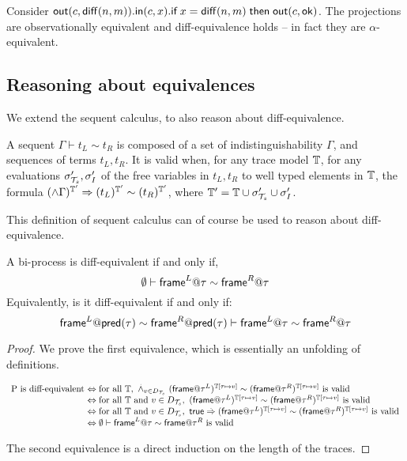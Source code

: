 \begin{example} \label{ex:problem}
  Consider $\mathsf{out}(c,\mathsf{diff}(n,m)).
  \mathsf{in}(c,x).
  \textsf{if}\; x=\mathsf{diff}(n,m) \;\textsf{then}\; \mathsf{out}(c,\mathsf{ok})$.
  The projections are observationally equivalent and diff-equivalence
  holds -- in fact they are $\alpha$-equivalent.
\end{example}


\subsection{Reasoning about equivalences}

We extend the sequent calculus, to also reason about diff-equivalence.

\begin{definition}
  A sequent $\Gamma \vdash t_L \sim t_R $ is composed of a set of indistinguishability $\Gamma$, and sequences of terms $t_L,t_R$.
  It is valid when, for any trace model $\mathbb{T}$, for any evaluations $\sigma_{\mathcal{T}_s}',\sigma_I'$ of the free variables in $t_L,t_R$ to well typed elements in $\mathbb{T}$, the formula $ (\wedge \Gamma)^{\mathbb{T}'} \Rightarrow (t_L)^{\mathbb{T}'} \sim  (t_R)^{\mathbb{T}'}$, where $\mathbb{T}'=\mathbb{T} \cup \sigma_{\mathcal{T}_s}'\cup \sigma_I'$.
\end{definition}

This definition of sequent calculus can of course be used to reason about diff-equivalence.
\begin{lemma}
  A bi-process is diff-equivalent if and only if,
  \[ \emptyset \vdash  \textsf{frame}^L@\tau \sim \textsf{frame}^R@\tau\]
  Equivalently, is it diff-equivalent if and only if:
  \[\textsf{frame}^L@\textsf{pred}(\tau) \sim \textsf{frame}^R@\textsf{pred}(\tau) \vdash \textsf{frame}^L@\tau \sim \textsf{frame}^R@\tau\]
\end{lemma}
\begin{proof}We prove the first equivalence, which is essentially an unfolding of definitions.

    \[
    \begin{array}{l@{~}l}
      $P$\text{ is diff-equivalent} & \Leftrightarrow \text{for all } \TM,\ \stackrel{.}{\wedge}_{v\in D_\XT} (\mframe@\tau^L)^{\TM[\tau\mapsto v]} \sim (\mframe@\tau^R)^{\TM[\tau \mapsto v]}\text{ is valid}\\
                                    & \Leftrightarrow \text{for all } \TM\text{ and } v\in D_\XT,\ (\mframe@\tau^L)^{\TM[\tau\mapsto v]} \sim (\mframe@\tau^R)^{\TM[\tau \mapsto v]}\text{ is valid}\\
      & \Leftrightarrow \text{for all } \TM\text{ and } v\in D_\XT,\ \true \stackrel{.}{\Rightarrow} (\mframe@\tau^L)^{\TM[\tau\mapsto v]} \sim (\mframe@\tau^R)^{\TM[\tau \mapsto v]}\text{ is valid}\\
      & \Leftrightarrow  \emptyset \vdash  \mframe^L@\tau \sim \mframe@\tau^R\text{ is valid}\\

    \end{array}
    \]

    The second equivalence is a direct induction on the length of the traces.
  \end{proof}

